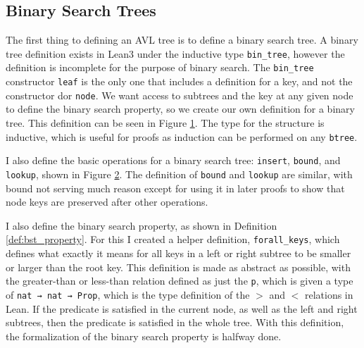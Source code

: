 \subsection*{Binary Search Trees}
The first thing to defining an AVL tree is to define a binary search tree. A binary tree 
definition exists in Lean3 under the inductive type \lstinline{bin_tree}, however the definition is incomplete
for the purpose of binary search. The \lstinline{bin_tree} constructor \lstinline{leaf} is the only one that includes a 
definition for a key, and not the constructor dor \lstinline{node}. We want access to subtrees and the key at any given node 
to define the binary search property, so we create our own definition for a binary tree. This definition can be seen in Figure \ref{lst:btree}.
The type for the structure is inductive, which is useful for proofs as induction can be performed on any \lstinline{btree}.

\begin{figure}[!h]
  \centering
  
  \caption{}
  \label{lst:btree}
\end{figure}

I also define the basic operations for a binary search tree: \lstinline{insert}, \lstinline{bound},
and \lstinline{lookup}, shown in Figure \ref{lst:basic_ops}. The definition of \lstinline{bound} and \lstinline{lookup} are similar, with bound not serving much reason except for
using it in later proofs to show that node keys are preserved after other operations.  

\begin{figure}[!ht]
  \centering
  
  \caption{}
  \label{lst:basic_ops}
\end{figure}

I also define the binary search property, as shown in Definition \ref{def:bst_property}. For this I created a helper definition, \lstinline{forall_keys}, which 
defines what exactly it means for all keys in a left or right subtree to be smaller or larger than the root key. This definition is made as abstract as possible, with the 
greater-than or less-than relation defined as just the  \lstinline{p}, which is given a type of \lstinline{nat → nat → Prop}, which is the type definition of the 
$>$ and $<$ relations in Lean. If the predicate is satisfied in the current node, as well as the left and right subtrees, then the predicate is satisfied in the whole tree. With this definition,
the formalization of the binary search property is halfway done.


